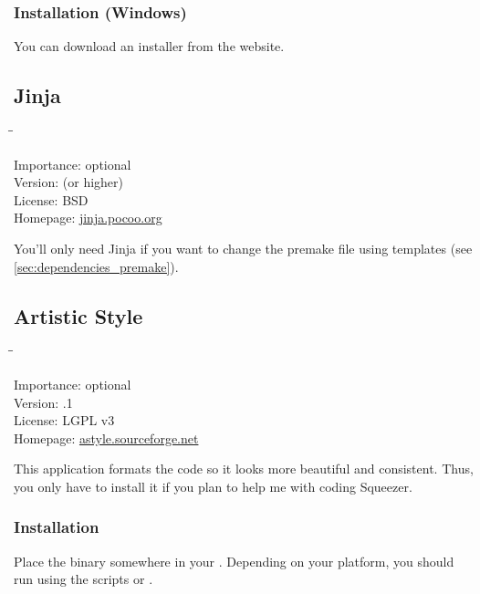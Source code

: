 \subsubsection{Installation (Windows)}

You can download an installer from the website.

\subsection{Jinja}

\begin{tabbing}
  \hspace*{6em}\=\=\kill

  Importance:  \> optional \\
  Version:      (or higher) \\
  License:     \> BSD \\
  Homepage:    \> \href{http://jinja.pocoo.org/}{jinja.pocoo.org}
\end{tabbing}

You'll only need Jinja if you want to change the premake file using
templates (see \ref{sec:dependencies_premake}).

\subsection{Artistic Style}

\begin{tabbing}
  \hspace*{6em}\=\=\kill

  Importance:  \> optional \\
  Version:     .1 \\
  License:     \> LGPL v3 \\
  Homepage:    \> \href{http://astyle.sourceforge.net/}{astyle.sourceforge.net}
\end{tabbing}

This application formats the code so it looks more beautiful and
consistent.  Thus, you only have to install it if you plan to help me
with coding Squeezer.

\subsubsection{Installation}

Place the binary somewhere in your .  Depending on your
platform, you should run  using the scripts
 or .

